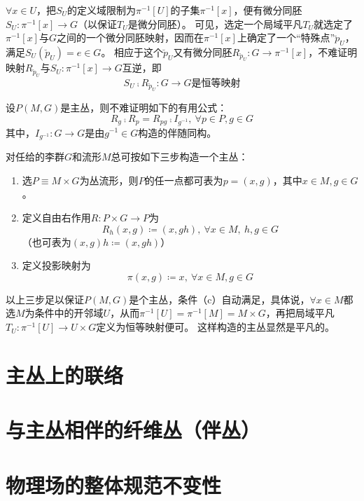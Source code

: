 \begin{note}
    $\forall x \in U$，把$S_U$的定义域限制为$\pi^{-1}[U]$的子集$\pi^{-1}[x]$，便有微分同胚$S_U \colon \pi^{-1}[x] \to G$（以保证$T_U$是微分同胚）。
    可见，选定一个局域平凡$T_U$就选定了$\pi^{-1}[x]$与$G$之间的一个微分同胚映射，因而在$\pi^{-1}[x]$上确定了一个``特殊点''$\breve{p}_U$，满足$S_U(\breve{p}_U) = e \in G$。
    相应于这个$\breve{p}_U$又有微分同胚$R_{\breve{p}_U} \colon G \to \pi^{-1}[x]$，不难证明映射$R_{\breve{p}_U}$与$S_U \colon \pi^{-1}[x] \to G$互逆，即
    $$S_U \comp R_{\breve{p}_U} \colon G \to G \text{是恒等映射}$$
\end{note}

\begin{note}
    设$P(M, G)$是主丛，则不难证明如下的有用公式：
    $$R_g \comp R_p = R_{pg} \comp I_{g^{-1}}, ~ \forall p \in P, g \in G$$
    其中，$I_{g^{-1}} \colon G \to G$是由$g^{-1} \in G$构造的伴随同构。
\end{note}

\begin{example}
    对任给的李群$G$和流形$M$总可按如下三步构造一个主丛：
    \begin{enumerate}[（1）]
        \item 选$P \equiv M \times G$为丛流形，则$P$的任一点都可表为$p = (x, g)$，其中$x \in M, g \in G$。
        \item 定义自由右作用$R \colon P \times G \to P$为
        $$R_h(x, g) \coloneq (x, gh), ~ \forall x \in M, ~ h,g \in G$$
        （也可表为$(x, g)h \coloneq (x, gh)$）
        \item 定义投影映射为
        $$\pi(x, g) \coloneq x, ~ \forall x \in M, g \in G$$
    \end{enumerate}
    以上三步足以保证$P(M, G)$是个主丛，条件（c）自动满足，具体说，$\forall x \in M$都选$M$为条件中的开邻域$U$，从而$\pi^{-1}[U] = \pi^{-1}[M] = M \times G$，再把局域平凡$T_U \colon \pi^{-1}[U] \to U \times G$定义为恒等映射便可。
    这样构造的主丛显然是平凡的。
\end{example}

\section{主丛上的联络}

\section{与主丛相伴的纤维丛（伴丛）}

\section{物理场的整体规范不变性}

